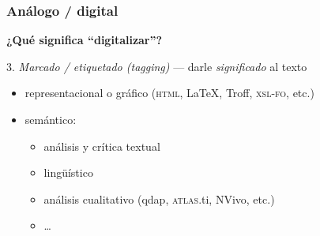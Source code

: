 \documentclass[%
  handout, %
  xcolor=svgnames]{beamer}
\newcommand*{\rojo}[1]{\textcolor[HTML]{8B0000}{#1}}
\newcommand*{\rojoit}[1]{\textit{\textcolor[HTML]{8B0000}{#1}}}
\newcommand{\Azul}{\color[HTML]{14145A}}
\begin{document}
\begin{frame}
  \frametitle{Análogo / digital}
  
  {\large\Azul\textbf{¿Qué significa \enquote{digitalizar}?}}

  \bigskip

  \rojo{3.} \rojoit{Marcado / etiquetado (\textit{tagging})} --- darle \textit{significado} al texto

  \begin{center}
    \begin{itemize}
      \item representacional o gráfico (\textsc{html}, \LaTeX, Troff, \textsc{xsl-fo}, etc.)
      \item semántico:
        \begin{itemize}
          \item análisis y crítica textual
          \item lingüístico
          \item análisis cualitativo (qdap, \textsc{atlas}.ti, NVivo, etc.)
          \item \dots
        \end{itemize}
    \end{itemize}
    
  \end{center}

\end{frame}






  




    
\end{document}
